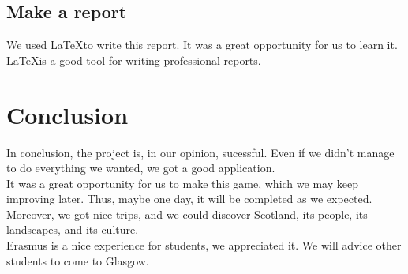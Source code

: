 \documentclass{scrreprt}
\begin{document}
					\section{Make a report}
					We used \LaTeX  to write this report. It was a great opportunity for us to learn it. \LaTeX is a good tool for writing professional reports.

					\chapter*{Conclusion} %
					
					In conclusion, the project is, in our opinion, sucessful. Even if we didn't manage to do everything we wanted, we got a good application.\\
					
					It was a great opportunity for us to make this game, which we may keep improving later. Thus, maybe one day, it will be completed as we expected.\\

					Moreover, we got nice trips, and we could discover Scotland, its people, its landscapes, and its culture.\\
		
					Erasmus is a nice experience for students, we appreciated it. We will advice other students to come to Glasgow.


					\appendix
\end{document}
